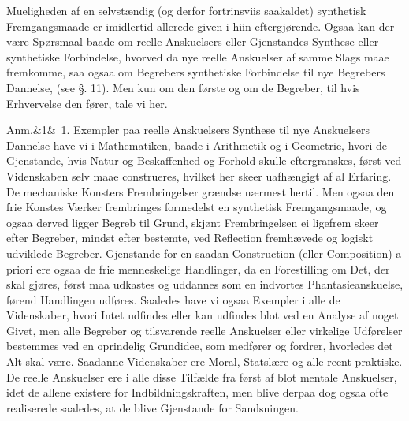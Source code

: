 \documentclass[12pt]{book}
\def\sperr#1{#1}%
\def\textit#1{#1}%
\def\emph#1{#1}%
\newcommand{\sperr}[1]{\textls[180]{#1}}
\newcommand{\anm}[1]{%
  \par\vspace{0.5\baselineskip}%
  \noindent\hspace{\parindent}\sperr{Anm.}\ifx&#1&\else~\textit{#1}.\fi
  \enspace\ignorespaces
}
\newcommand{\opage}[1]{\marginnote{\footnotesize\textit{[#1]}}}
\begin{document}
Mueligheden af en selvstændig (og derfor fortrinsviis saakaldet) \emph{synthetisk
Fremgangsmaade} er imidlertid allerede given i hiin eftergjørende. Ogsaa kan der være
Spørsmaal baade om reelle Anskuelsers eller Gjenstandes Synthese eller synthetiske
Forbindelse, hvorved da nye reelle Anskuelser af samme \emph{Slags} maae fremkomme, saa
ogsaa om Begrebers synthetiske Forbindelse til nye Begrebers Dannelse, (see §. 11). Men
kun om den første og om de Begreber, til hvis Erhvervelse den fører, tale vi her.

\anm{1} Exempler paa reelle Anskuelsers Synthese til nye Anskuelsers Dannelse have vi i
Mathematiken, baade i Arithmetik og i Geometrie, hvori de Gjenstande, hvis Natur og
Beskaffenhed og Forhold skulle eftergranskes, først ved Videnskaben selv maae
construeres, hvilket her skeer uafhængigt af al Erfaring. De mechaniske Konsters
Frembringelser grændse nærmest hertil. Men ogsaa den frie Konstes Værker frembringes
formedelst en synthetisk Fremgangsmaade, og ogsaa derved ligger Begreb til Grund,
skjønt Frembringelsen ei ligefrem skeer efter Begreber, mindst efter bestemte, ved
Reflection
\opage{155} fremhævede og logiskt udviklede Begreber. Gjenstande for en saadan Construction (eller
Composition) \textit{a priori} ere ogsaa de frie menneskelige Handlinger, da en
Forestilling om Det, der skal gjøres, først maa udkastes og uddannes som en indvortes
Phantasieanskuelse, førend Handlingen udføres. Saaledes have vi ogsaa Exempler i alle
de Videnskaber, hvori Intet udfindes eller kan udfindes blot ved en Analyse af noget
Givet, men alle Begreber og tilsvarende reelle Anskuelser eller virkelige Udførelser
bestemmes ved en oprindelig Grundidee, som medfører og fordrer, hvorledes det Alt skal
være. Saadanne Videnskaber ere Moral, Statslære og alle reent praktiske. De reelle
Anskuelser ere i alle disse Tilfælde fra først af blot mentale Anskuelser, idet de
allene existere for Indbildningskraften, men blive derpaa dog ogsaa ofte realiserede
saaledes, at de blive Gjenstande for Sandsningen.
\end{document}
